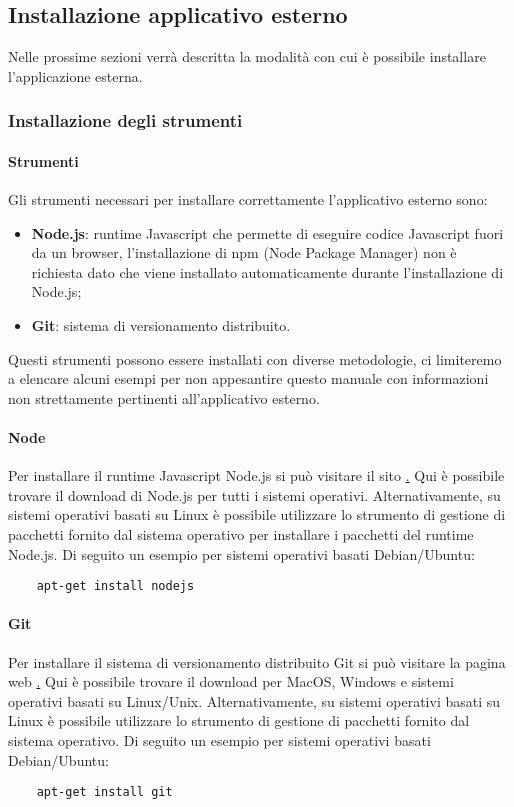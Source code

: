 \subsection{Installazione applicativo esterno}
Nelle prossime sezioni verrà descritta la modalità con cui è possibile installare l'applicazione esterna.

\subsubsection{Installazione degli strumenti}
\paragraph{Strumenti}
Gli strumenti necessari per installare correttamente l'applicativo esterno sono:
\begin{itemize}
    \item \textbf{Node.js}: runtime Javascript che permette di eseguire codice Javascript fuori da un browser, l'installazione di npm (Node Package Manager) non è richiesta dato che viene installato automaticamente durante l'installazione di Node.js;
    \item \textbf{Git}: sistema di versionamento distribuito.
\end{itemize}

Questi strumenti possono essere installati con diverse metodologie, ci limiteremo a elencare alcuni esempi per non appesantire questo manuale con informazioni non strettamente pertinenti all'applicativo esterno.

\paragraph{Node}
Per installare il runtime Javascript Node.js si può visitare il sito \href{https://nodejs.org}. Qui è possibile trovare il download di Node.js per tutti i sistemi operativi. Alternativamente, su sistemi operativi basati su Linux è possibile utilizzare lo strumento di gestione di pacchetti fornito dal sistema operativo per installare i pacchetti del runtime Node.js. Di seguito un esempio per sistemi operativi basati Debian/Ubuntu: \\
\begin{verbatim}
    apt-get install nodejs
\end{verbatim}

\paragraph{Git}
Per installare il sistema di versionamento distribuito Git si può visitare la pagina web \href{https://git-scm.com/downloads}. Qui è possibile trovare il download per MacOS, Windows e sistemi operativi basati su Linux/Unix. Alternativamente, su sistemi operativi basati su Linux è possibile utilizzare lo strumento di gestione di pacchetti fornito dal sistema operativo.  Di seguito un esempio per sistemi operativi basati Debian/Ubuntu: \\
\begin{verbatim}
    apt-get install git
\end{verbatim}

